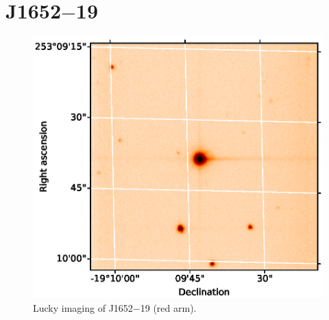 \section{J1652$-$19}

\begin{figure}
    \centering
    \includegraphics{8-Results/J1652-19/lucky.eps}
    \caption{Lucky imaging of J1652$-$19 (red arm).}
    \label{fig:J1652-19:lucky}
\end{figure}

